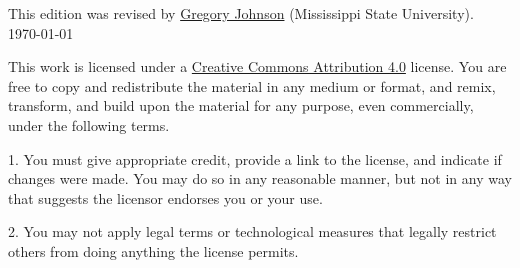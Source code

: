 \noindent This edition was revised by \href{http://loighic.net/}{Gregory Johnson} (Mississippi State University).\\[1ex]
\indent \today

\bigskip
\bigskip

\noindent \footnotesize This work is licensed under a \href{https://creativecommons.org/licenses/by/4.0/}{Creative Commons Attribution 4.0} license. 
You are free to copy and redistribute the material in any medium or format, and  remix, transform, and build upon the material for any purpose, even commercially, under the following terms.
\begin{earg}
\item[1.] You must give appropriate credit, provide a link to the license, and indicate if changes were made. You may do so in any reasonable manner, but not in any way that suggests the licensor endorses you or your use.
\item[2.] You may not apply legal terms or technological measures that legally restrict others from doing anything the license permits.
\end{earg}



\normalsize 
